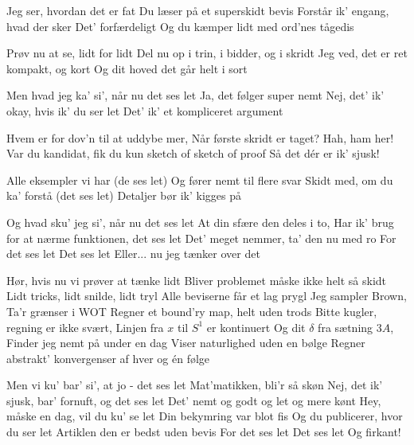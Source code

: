 \documentclass[a4paper,11pt]{article}
\begin{document}
\begin{song}
 Jeg ser, hvordan det er fat
          Du læser på et superskidt bevis
          Forstår ik' engang, hvad der sker
          Det' forfærdeligt
          Og du kæmper lidt med ord'nes tågedis
          
 Prøv nu at se, lidt for lidt
          Del nu op i trin, i bidder, og i skridt
          Jeg ved, det er ret kompakt, og kort
          Og dit hoved det går helt i sort
          
 Men hvad jeg ka' si', når nu det ses let
          Ja, det følger super nemt
          Nej, det' ik' okay, hvis ik' du ser let
          Det' ik' et kompliceret argument
          
 Hvem er for dov'n til at uddybe mer,
          Når første skridt er taget? Hah, ham her!
          Var du kandidat, fik du kun sketch of sketch of proof
          Så det dér er ik' sjusk!
          
 Alle eksempler vi har (de ses let)
          Og fører nemt til flere svar
          Skidt med, om du ka' forstå (det ses let)
          Detaljer bør ik' kigges på        
          
 Og hvad sku' jeg si', når nu det ses let
          At din sfære den deles i to,
          Har ik' brug for at nærme funktionen, det ses let
          Det' meget nemmer, ta' den nu med ro
          For det ses let
          Det ses let
          Eller... nu jeg tænker over det
         
 Hør, hvis nu vi prøver at tænke lidt
          Bliver problemet måske ikke helt så skidt
          Lidt tricks, lidt snilde, lidt tryl
          Alle beviserne får et lag prygl
          Jeg sampler Brown,
          Ta'r grænser i WOT
          Regner et bound'ry map, helt uden trods
          Bitte kugler, regning er ikke svært,
          Linjen fra $x$ til $S^1$ er kontinuert
          Og dit $\delta$ fra sætning $3A$,
          Finder jeg nemt på under en dag
          Viser naturlighed uden en bølge
          Regner abstrakt' konvergenser af hver og én følge
          
 Men vi ku' bar' si', at jo - det ses let
          Mat'matikken, bli'r så skøn
          Nej, det ik' sjusk, bar' fornuft, og det ses let
          Det' nemt og godt og let og mere kønt
          Hey, måske en dag, vil du ku' se let
          Din bekymring var blot fis
          Og du publicerer, hvor du ser let
          Artiklen den er bedst uden bevis
          For det ses let
          Det ses let
          Og firkant!
\end{song}
\end{document}
